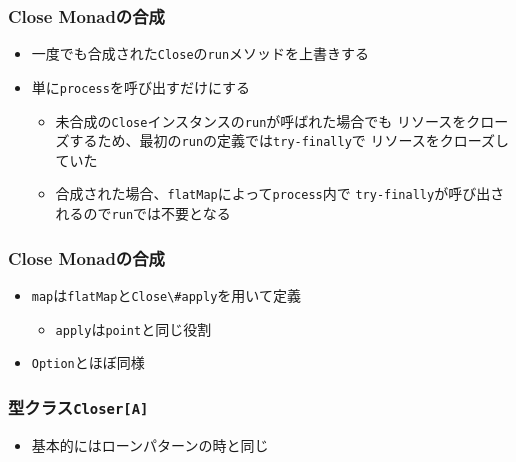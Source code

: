 \begin{frame}
  \frametitle{Close Monadの合成}

  

  \begin{itemize}
    \item<2-> 一度でも合成された\lstinline|Close|の\lstinline|run|メソッドを上書きする
    \item<3-> 単に\lstinline|process|を呼び出すだけにする
    \begin{itemize}
      \item<4-> 未合成の\lstinline|Close|インスタンスの\lstinline|run|が呼ばれた場合でも
      リソースをクローズするため、最初の\lstinline|run|の定義では\lstinline|try-finally|で
      リソースをクローズしていた
      \item<5-> 合成された場合、\lstinline|flatMap|によって\lstinline|process|内で
      \lstinline|try-finally|が呼び出されるので\lstinline|run|では不要となる
    \end{itemize}
  \end{itemize}
\end{frame}

\begin{frame}
  \frametitle{Close Monadの合成}

  

  

  \begin{itemize}
    \item<2-> \lstinline|map|は\lstinline|flatMap|と\lstinline|Close\#apply|を用いて定義
    \begin{itemize}
      \item<3-> \lstinline|apply|は\lstinline|point|と同じ役割
    \end{itemize}
    \item<4-> \lstinline|Option|とほぼ同様
  \end{itemize}
\end{frame}

\begin{frame}
  \frametitle{型クラス\protect\lstinline|Closer[A]|}

  

  \begin{itemize}
    \item<2-> 基本的にはローンパターンの時と同じ
  \end{itemize}
\end{frame}

